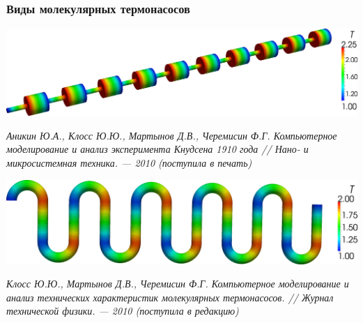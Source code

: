\documentclass[ucs]{beamer}
\begin{document}
\subsection{}
\begin{frame}
	\frametitle{Виды молекулярных термонасосов}	
	\begin{center}
	\includegraphics[width=0.7\columnwidth]{Klassic.png}
	\end{center}
	{\footnotesize \textit{Аникин Ю.А., Клосс Ю.Ю., Мартынов Д.В., Черемисин Ф.Г. Компьютерное моделирование и анализ эксперимента Кнудсена 1910 года // Нано- и микросистемная техника. — 2010 (поступила в печать)}}
	\begin{center}
	\includegraphics[width=0.7\columnwidth]{Snake.png}
	\end{center}
	{\footnotesize \textit{Клосс Ю.Ю., Мартынов Д.В., Черемисин Ф.Г. Компьютерное моделирование и анализ технических характеристик молекулярных термонасосов. // Журнал технической физики. — 2010 (поступила в редакцию)}}
\end{frame}
\end{document}
